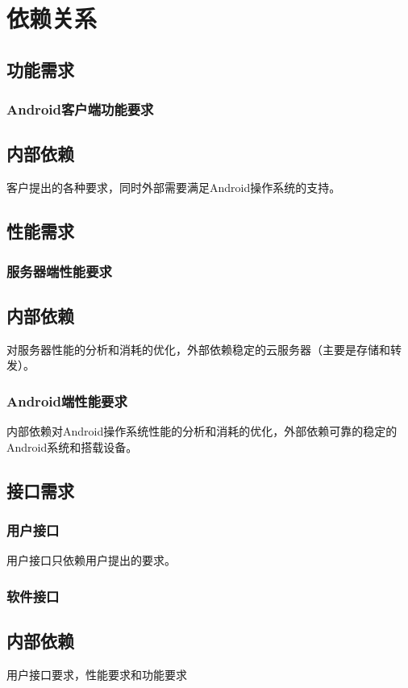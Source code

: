 \chapter{依赖关系}



\section{功能需求}
\subsection{Android客户端功能要求}
\section{内部依赖}
客户提出的各种要求，同时外部需要满足Android操作系统的支持。

\section{性能需求}

\subsection{服务器端性能要求}
\section{内部依赖}
对服务器性能的分析和消耗的优化，外部依赖稳定的云服务器（主要是存储和转发）。
\subsection{Android端性能要求}
内部依赖对Android操作系统性能的分析和消耗的优化，外部依赖可靠的稳定的Android系统和搭载设备。

\section{接口需求}

\subsection{用户接口}
用户接口只依赖用户提出的要求。
\subsection{软件接口}
\section{内部依赖}
用户接口要求，性能要求和功能要求


